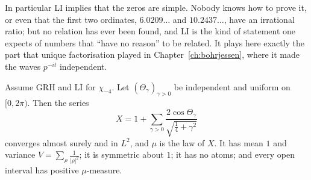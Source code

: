 In particular LI implies that the zeros are simple. Nobody knows how to prove it, or even that the first two ordinates, $6.0209\ldots$ and $10.2437\ldots$, have an irrational ratio; but no relation has ever been found, and LI is the kind of statement one expects of numbers that ``have no reason'' to be related. It plays here exactly the part that unique factorisation played in Chapter~\ref{ch:bohrjessen}, where it made the waves $p^{-it}$ independent.

\begin{theorem}\label{thm:rubinsteinsarnak}
Assume GRH and LI for $\chi_{-4}$. Let $(\Theta_\gamma)_{\gamma>0}$ be independent and uniform on $[0,2\pi)$. Then the series
\[
X=1+\sum_{\gamma>0}\frac{2\cos\Theta_\gamma}{\sqrt{\frac14+\gamma^2}}
\]
converges almost surely and in $L^2$, and $\mu$ is the law of $X$. It has mean $1$ and variance $V=\sum_\rho\frac1{|\rho|^2}$; it is symmetric about $1$; it has no atoms; and every open interval has positive $\mu$-measure.
\end{theorem}
